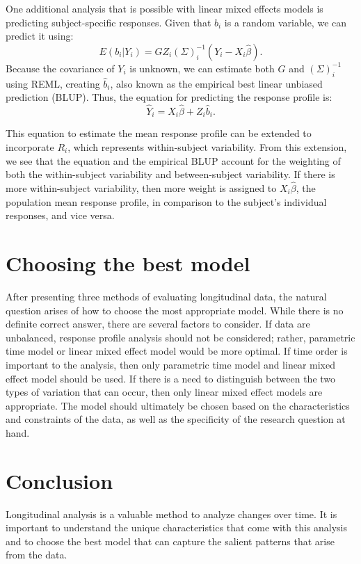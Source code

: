 \documentclass[12pt, twoside]{amherstthesis}
\begin{document}
One additional analysis that is possible with linear mixed effects models is predicting subject-specific responses. Given that \(b_i\) is a random variable, we can predict it using:
\[E(b_i |Y_i) = GZ_i (\Sigma)^{-1}_i(Y_i-X_i\hat\beta).\] Because the covariance of \(Y_i\) is unknown, we can estimate both \(G\) and \((\Sigma)^{-1}_i\) using REML, creating \(\hat b_i\), also known as the empirical best linear unbiased prediction (BLUP). Thus, the equation for predicting the response profile is:
\[\hat Y_i = X_i\hat\beta +Z_i\hat b_i.\]

This equation to estimate the mean response profile can be extended to incorporate \(R_i\), which represents within-subject variability. From this extension, we see that the equation and the empirical BLUP account for the weighting of both the within-subject variability and between-subject variability. If there is more within-subject variability, then more weight is assigned to \(X_i\hat\beta\), the population mean response profile, in comparison to the subject's individual responses, and vice versa.

\hypertarget{choosing-the-best-model}{%
\section{Choosing the best model}\label{choosing-the-best-model}}

After presenting three methods of evaluating longitudinal data, the natural question arises of how to choose the most appropriate model. While there is no definite correct answer, there are several factors to consider. If data are unbalanced, response profile analysis should not be considered; rather, parametric time model or linear mixed effect model would be more optimal. If time order is important to the analysis, then only parametric time model and linear mixed effect model should be used. If there is a need to distinguish between the two types of variation that can occur, then only linear mixed effect models are appropriate. The model should ultimately be chosen based on the characteristics and constraints of the data, as well as the specificity of the research question at hand.

\hypertarget{conclusion}{%
\section{Conclusion}\label{conclusion}}

Longitudinal analysis is a valuable method to analyze changes over time. It is important to understand the unique characteristics that come with this analysis and to choose the best model that can capture the salient patterns that arise from the data.
\end{document}
